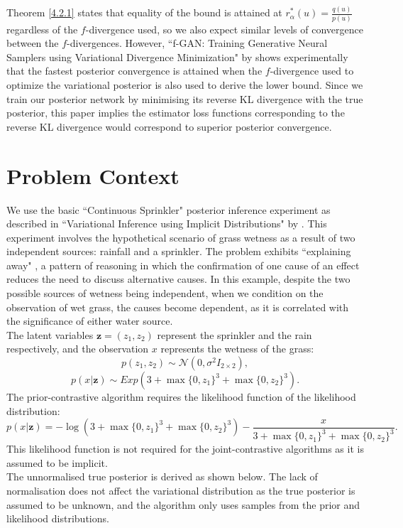 \documentclass[honours,12pt]{unswthesis}
\numberwithin{equation}{section}
\theoremstyle{definition}
\begin{document}
Theorem \ref{4.2.1} states that equality of the bound is attained at $r^*_\alpha(u)=\frac{q(u)}{p(u)}$ regardless of the $f$-divergence used, so we also expect similar levels of convergence between the $f$-divergences. However, ``f-GAN: Training Generative Neural Samplers using Variational Divergence Minimization" by \citet{nowozin} shows experimentally that the fastest posterior convergence is attained when the $f$-divergence used to optimize the variational posterior is also used to derive the lower bound. Since we train our posterior network by minimising its reverse KL divergence with the true posterior, this paper implies the estimator loss functions corresponding to the reverse KL divergence would correspond to superior posterior convergence.
\section{Problem Context}
We use the basic ``Continuous Sprinkler" posterior inference experiment as described in ``Variational Inference using Implicit Distributions" by \citet{huszar}. This experiment involves the hypothetical scenario of grass wetness as a result of two independent sources: rainfall and a sprinkler. The problem exhibits ``explaining away" \citep{explain}, a pattern of reasoning in which the confirmation of one cause of an effect reduces the need to discuss alternative causes. In this example, despite the two possible sources of wetness being independent, when we condition on the observation of wet grass, the causes become dependent, as it is correlated with the significance of either water source.\\ 
The latent variables $\bm{z}=(z_1, z_2)$ represent the sprinkler and the rain respectively, and the observation $x$ represents the wetness of the grass:
\[p(z_1,z_2)\sim \mathcal{N} (0,\sigma^2 I_{2\times 2}),\]
\[p(x|\bm{z})\sim Exp(3+\max\{0,z_1\}^3+\max\{0,z_2\}^3).\]
The prior-contrastive algorithm requires the likelihood function of the likelihood distribution:
\[p(x|\bm{z})=-\log (3+\max \{0,z_1\}^3+\max\{0,z_2\}^3)-\frac{x}{3+\max \{0,z_1\}^3+\max\{0,z_2\}^3}.\]
This likelihood function is not required for the joint-contrastive algorithms as it is assumed to be implicit.\\
The unnormalised true posterior is derived as shown below. The lack of normalisation does not affect the variational distribution as the true posterior is assumed to be unknown, and the algorithm only uses samples from the prior and likelihood distributions.\\
\end{document}
